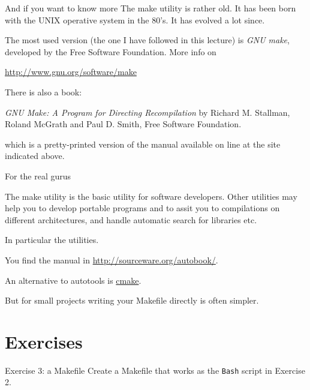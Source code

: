 \documentclass[10pt,aspectratio=169]{beamer}
\newcommand{\red}{\color{red}}
\begin{document}
\begin{frame}{And if you want to know more}
The make utility is rather old. It has been born with the UNIX operative
system in the 80's. It has evolved a lot since. 

The most used version (the one I have followed in this lecture) is \emph{GNU make}, developed by the Free Software Foundation. More info on

\href{http://www.gnu.org/software/make}{http://www.gnu.org/software/make}
\medskip

There is also a book:
\smallskip

\emph{GNU Make: A Program for Directing Recompilation}
by Richard M. Stallman, Roland McGrath and Paul D. Smith, Free Software
Foundation.
\smallskip

which is a pretty-printed version of the manual available on line at the
site indicated above.
\end{frame}



\begin{frame}{For the real gurus}

The make utility is the basic utility for software developers. Other
utilities may help you to develop portable programs and to assit you to
compilations on different architectures, and handle automatic search for libraries etc.
\smallskip


In particular the \red{autotools} utilities. 

You find the manual in 
\href{http://sourceware.org/autobook/}{http://sourceware.org/autobook/}.
\smallskip

An alternative to autotools is \href{https://cmake.org/}{cmake}.
\medskip

But for small projects writing your Makefile directly is often simpler.
\end{frame}

\section*{Exercises}
\begin{frame}{Exercise 3: a Makefile}
  Create a Makefile that works as the \texttt{Bash} script in Exercise 2.
\end{frame}
\end{document}
